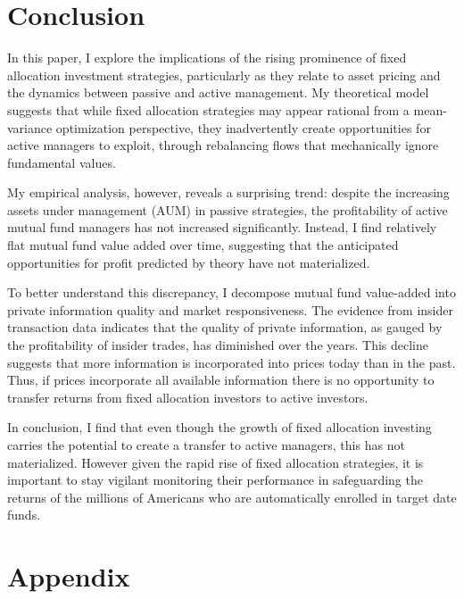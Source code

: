 \documentclass[12pt]{article}
\begin{document}
\section{Conclusion} \label{sec:conclusion}
\par In this paper, I explore the implications of the rising prominence of fixed allocation investment strategies, particularly as they relate to asset pricing and the dynamics between passive and active management. My theoretical model suggests that while fixed allocation strategies may appear rational from a mean-variance optimization perspective, they inadvertently create opportunities for active managers to exploit, through rebalancing flows that mechanically ignore fundamental values.

\par My empirical analysis, however, reveals a surprising trend: despite the increasing assets under management (AUM) in passive strategies, the profitability of active mutual fund managers has not increased significantly. Instead, I find relatively flat mutual fund value added over time, suggesting that the anticipated opportunities for profit predicted by theory have not materialized.

\par To better understand this discrepancy, I decompose mutual fund value-added into private information quality and market responsiveness. The evidence from insider transaction data indicates that the quality of private information, as gauged by the profitability of insider trades, has diminished over the years. This decline suggests that more information is incorporated into prices today than in the past. Thus, if prices incorporate all available information there is no opportunity to transfer returns from fixed allocation investors to active investors.

\par In conclusion, I find that even though the growth of fixed allocation investing carries the potential to create a transfer to active managers, this has not materialized. However given the rapid rise of fixed allocation strategies, it is important to stay vigilant monitoring their performance in safeguarding the returns of the millions of Americans who are automatically enrolled in target date funds.
\newpage 


\newpage
\appendix
\section{Appendix}
\end{document}
